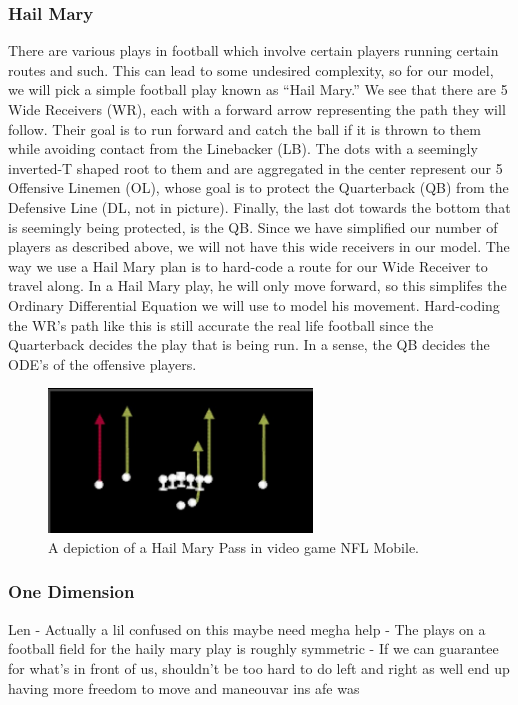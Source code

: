 \subsubsection{Hail Mary}

\quad There are various plays in football which involve certain players running certain routes and such. This can lead to some undesired complexity, so for our model, we will pick a simple football play known as “Hail Mary.” We see that there are 5 Wide Receivers (WR), each with a forward arrow representing the path they will follow. Their goal is to run forward and catch the ball if it is thrown to them while avoiding contact from the Linebacker (LB). The dots with a seemingly inverted-T shaped root to them and are aggregated in the center represent our 5 Offensive Linemen (OL), whose goal is to protect the Quarterback (QB) from the Defensive Line (DL, not in picture). Finally, the last dot towards the bottom that is seemingly being protected, is the QB. Since we have simplified our number of players as described above, we will not have this wide receivers in our model. The way we use a Hail Mary plan is to hard-code a route for our Wide Receiver to travel along. In a Hail Mary play, he will only move forward, so this simplifes the Ordinary Differential Equation we will use to model his movement. Hard-coding the WR's path like this is still accurate the real life football since the Quarterback decides the play that is being run. In a sense, the QB decides the ODE's of the offensive players. \\

\begin{figure}[htp]
    \centering
    \includegraphics[width=7cm]{figure/hailMary.png}
    \caption{A depiction of a Hail Mary Pass in video game NFL Mobile.}
\end{figure}

\subsubsection{One Dimension}


Len 
- Actually a lil confused on this maybe need megha help
- The plays on a football field for the haily mary play is roughly symmetric
- If we can guarantee for what's in front of us, shouldn't be too hard to do left and right
  as well end up having more freedom to move and maneouvar ins afe was

